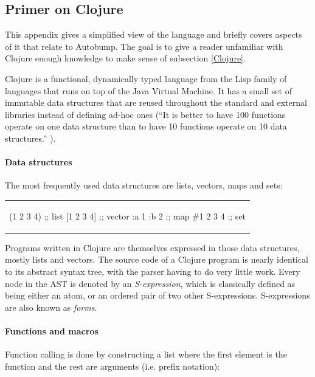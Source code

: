 \documentclass{l4proj}
\begin{document}
\begin{appendices}
\chapter{Primer on Clojure}
\label{ClojurePrimer}

This appendix gives a simplified view of the language and briefly
covers aspects of it that relate to Autobump. The goal is to give a
reader unfamiliar with Clojure enough knowledge to make sense of
subsection \ref{Clojure}.

Clojure is a functional, dynamically typed language from the Lisp
family of languages that runs on top of the Java Virtual Machine. It
has a small set of immutable data structures that are reused
throughout the standard and external libraries instead of defining
ad-hoc ones (``It is better to have 100 functions operate on one data
structure than to have 10 functions operate on 10 data
structures.'' \cite{ClojureRationale}).

\subsubsection{Data structures}

The most frequently used data structures are lists, vectors, maps and
sets:

\begin{center}
\begin{tabular}{c}
\begin{clojure}
(1 2 3 4)    ;; list
[1 2 3 4]    ;; vector
{:a 1 :b 2}  ;; map
#{1 2 3 4}   ;; set
\end{clojure}
\end{tabular}
\end{center}

Programs written in Clojure are themselves expressed in those data
structures, mostly lists and vectors. The source code of a Clojure
program is nearly identical to its abstract syntax tree, with the
parser having to do very little work. Every node in the AST is denoted
by an \textit{S-expression}, which is classically defined as being either an
atom, or an ordered pair of two other S-expressions. S-expressions are
also known as \textit{forms}.

\subsubsection{Functions and macros}

Function calling is done by constructing a list where the first
element is the function and the rest are arguments (i.e. prefix
notation):


\end{appendices}
\end{document}
